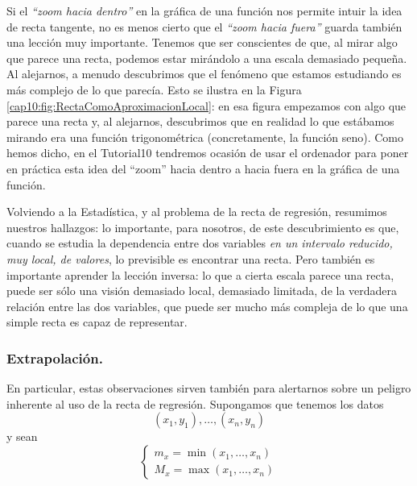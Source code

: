 Si el {\em ``zoom hacia dentro''} en la gráfica de una función nos permite intuir la idea de recta tangente, no es menos cierto que el {\em ``zoom hacia fuera''} guarda también una lección muy importante. Tenemos que ser conscientes de que, al mirar algo que parece una recta, podemos estar mirándolo a una escala demasiado pequeña. Al alejarnos, a menudo descubrimos que el fenómeno que estamos estudiando es más complejo de lo que parecía. Esto se ilustra en  la Figura \ref{cap10:fig:RectaComoAproximacionLocal}: en esa figura empezamos con algo que parece una recta y, al alejarnos, descubrimos que en realidad lo que estábamos mirando era una función trigonométrica (concretamente, la función seno). Como hemos dicho, en el Tutorial10 tendremos ocasión de usar el ordenador para poner en práctica esta idea del ``zoom'' hacia dentro a hacia fuera en la gráfica de una función.

Volviendo a la Estadística, y al problema de la recta de regresión, resumimos nuestros hallazgos: lo importante, para nosotros, de este descubrimiento es que, cuando se estudia la dependencia entre dos variables {\em en un intervalo reducido, muy local, de valores}, lo previsible es encontrar una recta. Pero también es importante aprender la lección inversa: lo que a cierta escala parece una recta, puede ser sólo una visión demasiado local, demasiado limitada, de la verdadera relación entre las dos variables, que puede ser mucho más compleja de lo que una simple recta es capaz de representar.

\subsubsection*{Extrapolación.}
\label{cap10:subsubsec:Extrapolacion}

En particular, estas observaciones sirven también para alertarnos sobre un peligro inherente al uso de la recta de regresión. Supongamos que tenemos los datos
        \[(x_1,y_1),\ldots,(x_n,y_n)\]
        y sean
        \[
        \begin{cases}
        m_x=\min(x_1,\ldots,x_n)\\
        M_x=\max(x_1,\ldots,x_n)
        \end{cases}
        \]

